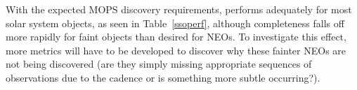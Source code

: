 With the expected MOPS discovery requirements,
 performs adequately for most solar system
objects, as seen in Table~\ref{ssoperf}, although completeness falls off more rapidly for faint
objects than desired for NEOs. To investigate this effect, more
metrics will have to be developed to discover why these fainter NEOs
are not being discovered (are they simply missing appropriate
sequences of observations due to the cadence or is something more
subtle occurring?).

%
%
%
%
%
%
%
%
%
%
%
%

